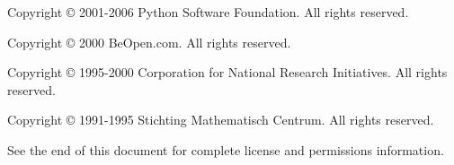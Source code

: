 Copyright \copyright{} 2001-2006 Python Software Foundation.
All rights reserved.

Copyright \copyright{} 2000 BeOpen.com.
All rights reserved.

Copyright \copyright{} 1995-2000 Corporation for National Research Initiatives.
All rights reserved.

Copyright \copyright{} 1991-1995 Stichting Mathematisch Centrum.
All rights reserved.

See the end of this document for complete license and permissions
information.
